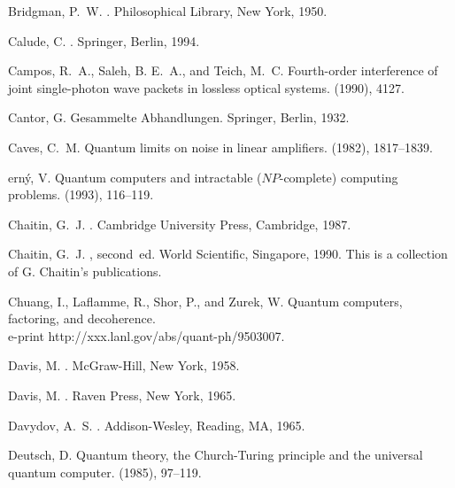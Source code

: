 \begin{thebibliography}{100}
{\sc Bridgman, P.~W.}
.
\newblock Philosophical Library, New York, 1950.

{\sc Calude, C.}
.
\newblock Springer, Berlin, 1994.

{\sc Campos, R.~A., Saleh, B. E.~A., and Teich, M.~C.}
\newblock Fourth-order interference of joint single-photon wave packets in
  lossless optical systems.
 (1990), 4127.

{\sc Cantor, G.}
\newblock Gesammelte Abhandlungen.
\newblock Springer, Berlin, 1932.

{\sc Caves, C.~M.}
\newblock Quantum limits on noise in linear amplifiers.
 (1982), 1817--1839.

{ern{\'{y}}, V.}
\newblock Quantum computers and intractable ({$NP$}-complete) computing
  problems.
 (1993), 116--119.

{\sc Chaitin, G.~J.}
.
\newblock Cambridge University Press, Cambridge, 1987.

{\sc Chaitin, G.~J.}
, second~ed.
\newblock World Scientific, Singapore, 1990.
\newblock This is a collection of G. Chaitin's publications.

{\sc Chuang, I., Laflamme, R., Shor, P., and Zurek, W.}
\newblock Quantum computers, factoring, and decoherence.
\newblock \\e-print http://xxx.lanl.gov/abs/quant-ph/9503007.

{\sc Davis, M.}
.
\newblock McGraw-Hill, New York, 1958.

{\sc Davis, M.}
.
\newblock Raven Press, New York, 1965.

{\sc Davydov, A.~S.}
.
\newblock Addison-Wesley, Reading, MA, 1965.

{\sc Deutsch, D.}
\newblock Quantum theory, the {C}hurch-{T}uring principle and the universal
  quantum computer.
 (1985),
  97--119.


\end{thebibliography}
